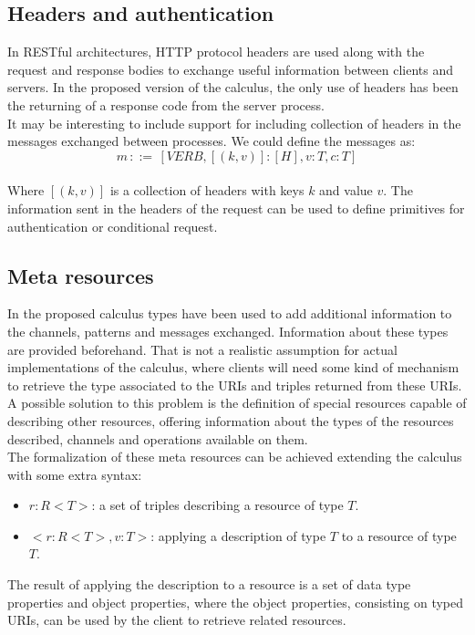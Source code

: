 \subsection{Headers and authentication}
In RESTful architectures, HTTP protocol headers are used along with the request and response bodies to exchange useful information between clients and servers. In the proposed version of the calculus, the only use of headers has been the returning of a response code from the server process.\\
It may be interesting to include support for including collection of headers in the messages exchanged between processes. We could define the messages as:\\
\begin{equation*}
m\,::=\,[VERB,[(k,v)]:[H],v:T,c:T]
\end{equation*}
\\Where $[(k,v)]$ is a collection of headers with keys $k$ and value $v$. The information sent in the headers of the request can be used to define primitives for authentication or conditional request.

\subsection{Meta resources}
In the proposed calculus types have been used to add additional information to the channels, patterns and messages exchanged. Information about these types are provided beforehand. That is not a realistic assumption for actual implementations of the calculus, where clients will need some kind of mechanism to retrieve the type associated to the URIs and triples returned from these URIs. A possible solution to this problem is the definition of special resources capable of describing other resources, offering information about the types of the resources described, channels and operations available on them.\\
The formalization of these meta resources can be achieved extending the calculus with some extra syntax:
\begin{itemize}
  \item $r:R<T>$: a set of triples describing a resource of type $T$.
  \item $<r:R<T>,v:T>$: applying a description of type $T$ to a resource of type $T$.
\end{itemize}
The result of applying the description to a resource is a set of data type properties and object properties, where the object properties, consisting on typed URIs, can be used by the client to retrieve related resources.


